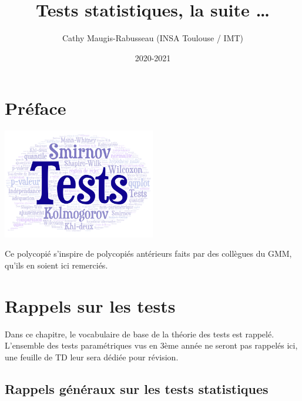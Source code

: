 \documentclass[
]{book}
\title{Tests statistiques, la suite \ldots{}}
\author{Cathy Maugis-Rabusseau (INSA Toulouse / IMT)}
\date{2020-2021}
\theoremstyle{definition}
\theoremstyle{definition}
\theoremstyle{definition}
\theoremstyle{definition}
\theoremstyle{remark}
\begin{document}
\maketitle

{
\setcounter{tocdepth}{1}
\tableofcontents
}
\newcommand{\E}{\mathbb{E}}
\newcommand{\R}{\mathbb{R}}
\newcommand{\N}{\mathbb{N}}
\newcommand{\NN}{\mathcal{N}}
\newcommand{\PP}{\mathbb{P}}
\newcommand{\Hc}{\mathcal{H}}
\newcommand{\1}{\mathbb{1}}
\newcommand{\Var}{\mbox{Var}}
\newcommand{\indep}{\perp \!\!\! \perp}
\newcommand{\vs}{\mbox{vs }}
\newcommand{\X}{\mathcal{X}}
\newcommand{\famille}{\left\{P_\theta,\ \theta\in\Theta\right\}}
\newcommand{\tribu}{{\mathcal E}}
\newcommand{\si}{\sigma}
\newcommand{\ZZ}{\mathcal{Z}}
\newcommand{\dd}{\rm{d}}

\hypertarget{pruxe9face}{%
\chapter*{Préface}\label{pruxe9face}}

\includegraphics[width=0.5\textwidth,height=\textheight]{image/ImageTests.png}

Ce polycopié s'inspire de polycopiés antérieurs faits par des collègues du GMM, qu'ils en soient ici remerciés.

\hypertarget{Rappels}{%
\chapter{Rappels sur les tests}\label{Rappels}}

Dans ce chapitre, le vocabulaire de base de la théorie des tests est rappelé. L'ensemble des tests paramétriques vus en 3ème année ne seront pas rappelés ici, une feuille de TD leur sera dédiée pour révision.

\hypertarget{rappels-guxe9nuxe9raux-sur-les-tests-statistiques}{%
\section{Rappels généraux sur les tests statistiques}\label{rappels-guxe9nuxe9raux-sur-les-tests-statistiques}}
\end{document}
